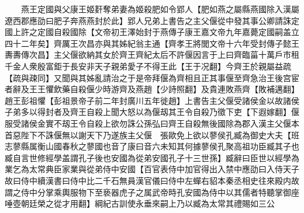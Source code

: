 　　燕王定國與父康王姬姧奪弟妻為姬殺肥如令郢人【肥如燕之屬縣燕國除入漢屬遼西郡應劭曰肥子奔燕燕封於此】郢人兄弟上書告之主父偃從中發其事公卿請誅定國上許之定國自殺國除【文帝初王澤始封于燕傳子康王嘉文帝九年嘉薨定國嗣盖立四十二年矣】齊厲王次昌亦與其姊紀翁主通【齊孝王將閭文帝十六年受封傳子懿王夀夀傳次昌】主父偃欲納其女於齊王齊紀太后不許偃因言于上曰齊臨菑十萬戶市租千金人衆殷富鉅于長安非天子親弟愛子不得王此【王于况翻】今齊王於親屬益疏【疏與疎同】又聞與其姊亂請治之于是帝拜偃為齊相且正其事偃至齊急治王後宫宦者辭及王王懼飲藥自殺偃少時游齊及燕趙【少詩照翻】及貴連敗燕齊【敗補邁翻】趙王彭祖懼【彭祖景帝子前二年封廣川五年徙趙】上書告主父偃受諸侯金以故諸侯子弟多以得封者及齊王自殺上聞大怒以為偃刼其王令自殺乃徵下吏【下遐嫁翻】偃服受諸侯金實不刼王令自殺上欲勿誅公孫弘曰齊王自殺無後國除為郡入漢主父偃本首惡陛下不誅偃無以謝天下乃遂族主父偃　張歐免上欲以蓼侯孔臧為御史大夫【班志蓼縣属衡山國春秋之蓼國也音了康曰音六未知其何據蓼侯孔聚高祖功臣臧其子也臧自言世修經學盖謂孔子後也安國為從弟安國孔子十三世孫】臧辭曰臣世以經學為業乞為太常典臣家業與從弟侍中安國【百官表侍中加官得出入禁中應劭曰入侍天子故曰侍中續漢書曰侍中比二千石無員漢官儀曰侍中左蟬右貂本秦丞相史往來殿内故謂之侍中分掌乘輿服物下至亵器虎子之属武帝時孔安國為侍中以其儒者特聽掌御座唾壺朝廷榮之從才用翻】綱紀古訓使永垂來嗣上乃以臧為太常其禮賜如三公

